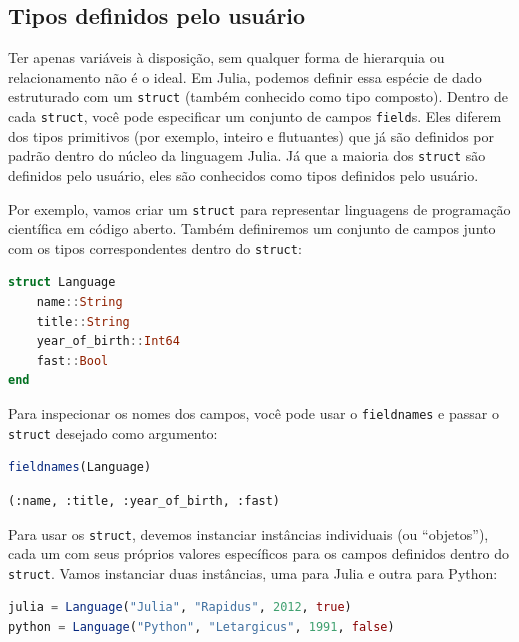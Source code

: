\documentclass[
  notoc %
]{tufte-book}
\newcommand{\passthrough}[1]{#1}
\begin{document}
\hypertarget{sec:struct}{%
\subsection{Tipos definidos pelo usuário}\label{sec:struct}}

Ter apenas variáveis à disposição, sem qualquer forma de hierarquia ou
relacionamento não é o ideal. Em Julia, podemos definir essa espécie de
dado estruturado com um \passthrough{\lstinline!struct!} (também
conhecido como tipo composto). Dentro de cada
\passthrough{\lstinline!struct!}, você pode especificar um conjunto de
campos \passthrough{\lstinline!field!}s. Eles diferem dos tipos
primitivos (por exemplo, inteiro e flutuantes) que já são definidos por
padrão dentro do núcleo da linguagem Julia. Já que a maioria dos
\passthrough{\lstinline!struct!} são definidos pelo usuário, eles são
conhecidos como tipos definidos pelo usuário.

Por exemplo, vamos criar um \passthrough{\lstinline!struct!} para
representar linguagens de programação científica em código aberto.
Também definiremos um conjunto de campos junto com os tipos
correspondentes dentro do \passthrough{\lstinline!struct!}:

\begin{lstlisting}[language=Julia]
struct Language
    name::String
    title::String
    year_of_birth::Int64
    fast::Bool
end
\end{lstlisting}

Para inspecionar os nomes dos campos, você pode usar o
\passthrough{\lstinline!fieldnames!} e passar o
\passthrough{\lstinline!struct!} desejado como argumento:

\begin{lstlisting}[language=Julia]
fieldnames(Language)
\end{lstlisting}

\begin{lstlisting}[language=Output]
(:name, :title, :year_of_birth, :fast)
\end{lstlisting}

Para usar os \passthrough{\lstinline!struct!}, devemos instanciar
instâncias individuais (ou ``objetos''), cada um com seus próprios
valores específicos para os campos definidos dentro do
\passthrough{\lstinline!struct!}. Vamos instanciar duas instâncias, uma
para Julia e outra para Python:

\begin{lstlisting}[language=Julia]
julia = Language("Julia", "Rapidus", 2012, true)
python = Language("Python", "Letargicus", 1991, false)
\end{lstlisting}
\end{document}
